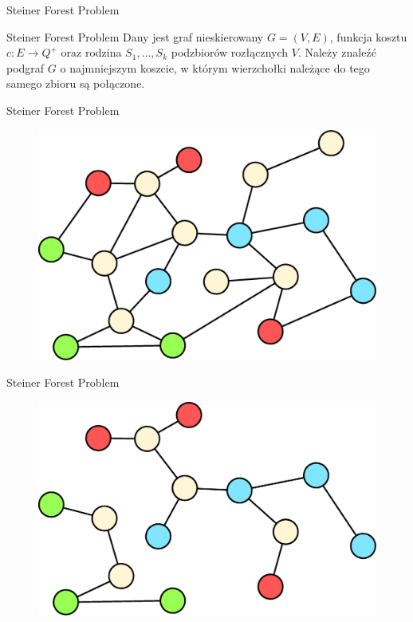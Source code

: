 \begin{frame}{Steiner Forest Problem}
\begin{block}{Steiner Forest Problem}
 Dany jest graf nieskierowany $G = (V, E)$, funkcja kosztu $c: E \rightarrow Q^+$ oraz rodzina $S_1, \hdots, S_k$ podzbiorów rozłącznych $V$. Należy znaleźć podgraf $G$ o najmniejszym koszcie, w którym wierzchołki należące do tego samego zbioru są połączone.
\end{block}
\end{frame}

\begin{frame}{Steiner Forest Problem}
\begin{figure}[ht]
\includegraphics[scale=0.32]{sf_example.eps}
\end{figure}
\end{frame}

\begin{frame}{Steiner Forest Problem}
\begin{figure}[ht]
\includegraphics[scale=0.32]{sf_example2.eps}
\end{figure}
\end{frame}


